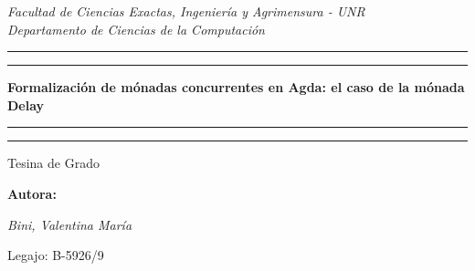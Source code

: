 \begin{titlepage}  %

	\centering %
	\scshape %
	
	\textit{\large Facultad de Ciencias Exactas, Ingeniería y Agrimensura - UNR\\Departamento de Ciencias de la Computación }
	
	\vspace{2\baselineskip}
	
	
	\rule{\textwidth}{1.6pt}\vspace*{-\baselineskip}\vspace*{2pt} %
	\rule{\textwidth}{0.4pt} %
	
	\vspace{\baselineskip} %
	
	{\LARGE \textbf{Formalización de mónadas concurrentes en Agda: el caso de la mónada
Delay}} %
	
	\vspace{\baselineskip} %
	
	\rule{\textwidth}{0.4pt}\vspace*{-\baselineskip}\vspace{3.2pt} %
	\rule{\textwidth}{1.6pt} %
	
	\vspace{2\baselineskip} %
	
	
	{\Large Tesina de Grado}
	\vspace*{3\baselineskip} %
	
	
	\Large{\textbf{Autora:}}
	
	
    {\itshape\LARGE Bini, Valentina María}
	
	
	\large{Legajo: B-5926/9}
	

\end{titlepage}
